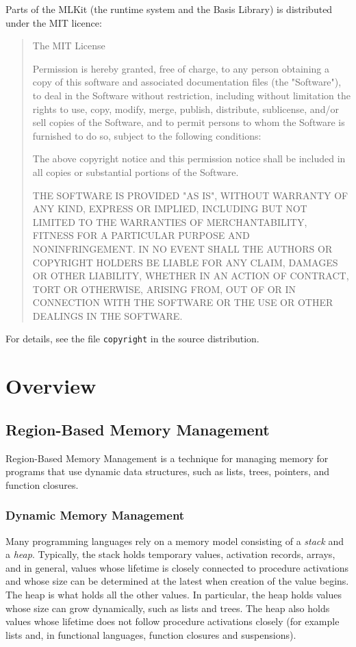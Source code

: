 \documentclass[12pt]{book}
\begin{document}
Parts of the MLKit (the runtime system and the Basis Library) is
distributed under the MIT licence:
{\sc
\begin{quote}
The MIT License

Permission is hereby granted, free of charge, to any person obtaining
a copy of this software and associated documentation files (the
"Software"), to deal in the Software without restriction, including
without limitation the rights to use, copy, modify, merge, publish,
distribute, sublicense, and/or sell copies of the Software, and to
permit persons to whom the Software is furnished to do so, subject to
the following conditions:

The above copyright notice and this permission notice shall be
included in all copies or substantial portions of the Software.

THE SOFTWARE IS PROVIDED "AS IS", WITHOUT WARRANTY OF ANY KIND,
EXPRESS OR IMPLIED, INCLUDING BUT NOT LIMITED TO THE WARRANTIES OF
MERCHANTABILITY, FITNESS FOR A PARTICULAR PURPOSE AND
NONINFRINGEMENT. IN NO EVENT SHALL THE AUTHORS OR COPYRIGHT HOLDERS BE
LIABLE FOR ANY CLAIM, DAMAGES OR OTHER LIABILITY, WHETHER IN AN ACTION
OF CONTRACT, TORT OR OTHERWISE, ARISING FROM, OUT OF OR IN CONNECTION
WITH THE SOFTWARE OR THE USE OR OTHER DEALINGS IN THE SOFTWARE.
\end{quote}
}

For details, see the file \texttt{copyright} in the source
distribution.


\part{Overview}

\chapter{Region-Based Memory Management}
\label{intro.sec}
Region-Based Memory Management is a technique for managing
memory for programs that use dynamic data structures, such as lists,
trees, pointers, and function closures.

\section{%
Dynamic Memory Management}
Many programming languages rely on a memory model consisting of a {\em
  stack}
%
and a 
%
{\em heap}. Typically, the stack holds temporary values, activation
records, arrays, and in general, values whose lifetime is closely
connected to procedure activations and whose size can be determined at
the latest when creation of the value begins.  The heap is what holds
all the other values. In particular, the heap holds values whose size
can grow dynamically, such as lists and trees. The heap also holds
values whose lifetime does not follow procedure activations closely
(for example lists and, in functional languages, function closures and
suspensions).
\end{document}
